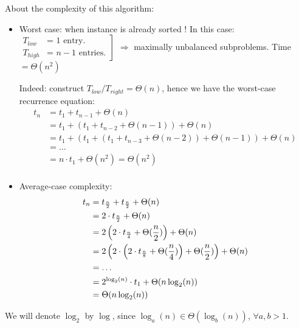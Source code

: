 About the complexity of this algorithm:
 \begin{itemize}
\renewcommand{\labelitemi}{$\bullet$}
\item Worst case: when instance is already sorted ! \newline
In this case: $\left.
	\begin{array}{ll}
       T_{low} & \text{= 1 entry}.\\
       T_{high} &\text{= $n-1$ entries}.
			\end{array}
  \right]$ $\Rightarrow$ maximally unbalanced subproblems. Time $= \Theta(n^2)$ 
	
	Indeed: construct $T_{low}/ T_{right} = \Theta(n)$, hence we have the worst-case recurrence equation: 
	\begin{align*}
t_n & = t_1 + t_{n-1}+ \Theta(n)\\
 & = t_1 + \left( t_1 + t_{n-2} + \Theta(n-1)\right)+ \Theta(n)\\
& = t_1 + \left( t_1 + (t_1 + t_{n-3}+ \Theta(n-2)) + \Theta(n-1)\right)+ \Theta(n)\\
& = \ldots \\
& = n \cdot t_1 + \Theta(n^2) = \Theta(n^2) \\
\end{align*}

\item Average-case complexity: \begin{align}
t_n & = t_{\frac{n}{2}}+ t_{\frac{n}{2}}+ \Theta(n) \label{eq:quickSort_average} \\
& = 2 \cdot t_{\frac{n}{2}} + \Theta(n)  \notag \\
& = 2 \left( 2 \cdot t_{\frac{n}{4}} + \Theta(\frac{n}{2})\right) + \Theta(n)  \notag \\
& =  2 \left( 2 \cdot \left(2 \cdot t_{\frac{n}{8}} + \Theta(\frac{n}{4})\right) + \Theta(\frac{n}{2})\right) + \Theta(n)  \notag \\
& = \ldots  \notag \\
& = 2^{\log_2(n)} \cdot t_1 + \Theta(n \log_2(n))  \notag \\
& = \Theta(n \log_2(n)) \notag
\end{align}

\end{itemize}

\begin{remark}
We will denote $\log_2$ by $\log$, since $\log_a(n)\in \Theta(\log_b(n))$, $\forall a,b >1$. 
\end{remark}

